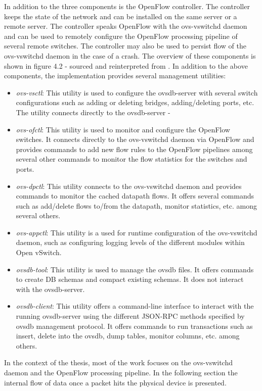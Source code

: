 In addition to the three components is the OpenFlow controller. The controller keeps the state of the network and can be installed on the same server or a remote server. The controller speaks OpenFlow with the ovs-vswitchd daemon and can be used to remotely configure the OpenFlow processing pipeline of several remote switches. The controller may also be used to persist flow of the ovs-vswitchd daemon in the case of a crash. The overview of these components is shown in figure 4.2 - sourced and reinterpreted from \cite{pfaff2015design}.
In addition to the above components, the implementation provides several management utilities:
\begin{itemize}
 \item \textit{ovs-vsctl}: This utility is used to configure the ovsdb-server with several switch configurations such as adding or deleting bridges, adding/deleting ports, etc. The utility connects directly to the ovsdb-server -
 \item \textit{ovs-ofctl}: This utility is used to monitor and configure the OpenFlow switches. It connects directly to the ovs-vswitchd daemon via OpenFlow and provides commands to add new flow rules to the OpenFlow pipelines among several other commands to monitor the flow statistics for the switches and ports.
 \item \textit{ovs-dpctl}: This utility connects to the ovs-vswitchd daemon and provides commands to monitor the cached datapath flows. It offers several commands such as add/delete flows to/from the datapath, monitor statistics, etc. among several others.
 \item \textit{ovs-appctl}: This utility is a used for runtime configuration of the ovs-vswitchd daemon, such as configuring logging levels of the different modules within Open vSwitch.
 \item \textit{ovsdb-tool}: This utility is used to manage the ovsdb files. It offers commands to create DB schemas and compact existing schemas. It does not interact with the ovsdb-server.
 \item \textit{ovsdb-client}: This utility offers a command-line interface to interact with the running ovsdb-server using the different JSON-RPC methods specified by ovsdb management protocol. It offers commands to run transactions such as insert, delete into the ovsdb, dump tables, monitor columns, etc. among others.
\end{itemize}

In the context of the thesis, most of the work focuses on the ovs-vswitchd daemon and the OpenFlow processing pipeline. In the following section the internal flow of data once a packet hits the physical device is presented.

